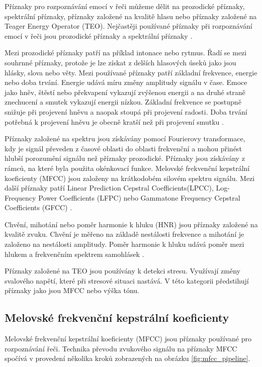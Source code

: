 \documentclass[FM,BP]{tulthesis}
\begin{document}
Příznaky pro rozpoznávání emocí v řeči můžeme dělit na prozodické příznaky, spektrální příznaky, příznaky založené na kvalitě hlasu nebo příznaky založené na Teager Energy Operator (TEO). Nejčastěji používané příznaky při rozpoznávání emocí v řeči jsou prozodické příznaky a spektrální příznaky \cite{DBLP:journals/speech/AkcayO20}.

Mezi prozodické příznaky patří na příklad intonace nebo rytmus. Řadí se mezi souhrnné příznaky, protože je lze získat z delších hlasových úseků jako jsou hlásky, slova nebo věty. Mezi používané příznaky patří základní frekvence, energie nebo doba trvání. Energie udává míru změny amplitudy signálu v čase. Emoce jako hněv, štěstí nebo překvapení vykazují zvýšenou energii a na druhé straně znechucení a smutek vykazují energii nízkou. Základní frekvence se postupně snižuje při projevení hněvu a naopak stoupá při projevení radosti. Doba trvání potřebná k projevení hněvu je obecně kratší než při projevení smutku \cite{DBLP:journals/speech/AkcayO20}.

Příznaky založené na spektru jsou získávány pomocí Fourierovy transformace, kdy je signál převeden z časové oblasti do oblasti frekvenční a mohou přinést hlubší porozumění signálu než příznaky prozodické. Příznaky jsou získávány z rámců, na které byla použita okénkovací funkce. Melovské frekvenční kepstrální koeficienty (MFCC) jsou založeny na krátkodobém silovém spektru signálu. Mezi další příznaky patří Linear Prediction Cepstral Coefficients(LPCC), Log-Frequency Power Coefficients (LFPC) nebo Gammatone Frequency Cepstral Coefficients (GFCC) \cite{DBLP:journals/speech/AkcayO20}.

Chvění, mihotání nebo poměr harmonie k hluku (HNR) jsou příznaky založené na kvalitě zvuku. Chvění je měřeno na základě nestálosti frekvence a mihotání je založeno na nestálosti amplitudy. Poměr harmonie k hluku udává poměr mezi hlukem a frekvenčním spektrem samohlásek \cite{DBLP:journals/speech/AkcayO20}.

Příznaky založené na TEO jsou používány k detekci stresu. Využívají změny svalového napětí, které při stresové situaci nastává. V této kategorii předstihují příznaky jako jsou MFCC nebo výška tónu.

\subsection{Melovské frekvenční kepstrální koeficienty} %
Melovské frekvenční kepstrální koeficienty (MFCC) jsou příznaky používané pro rozpoznávání řeči. Technika převodu zvukového signálu na příznaky MFCC spočívá v provedení několika kroků zobrazených na obrázku \ref{fig:mfcc_pipeline}. 
\end{document}
